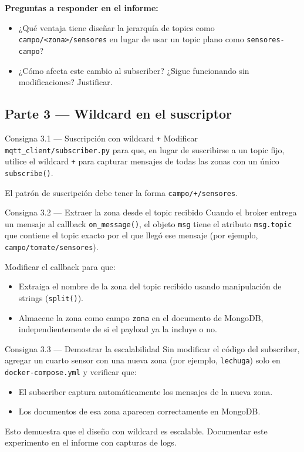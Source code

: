 \documentclass[12pt,a4paper]{article}
\begin{document}
\textbf{Preguntas a responder en el informe:}
\begin{itemize}
  \item ¿Qué ventaja tiene diseñar la jerarquía de topics como
        \texttt{campo/<zona>/sensores} en lugar de usar un topic
        plano como \texttt{sensores-campo}?
  \item ¿Cómo afecta este cambio al subscriber? ¿Sigue funcionando
        sin modificaciones? Justificar.
\end{itemize}

\subsection{Parte 3 — Wildcard en el suscriptor}

\begin{consigna}{Consigna 3.1 — Suscripción con wildcard \texttt{+}}
Modificar \texttt{mqtt\_client/subscriber.py} para que, en lugar de
suscribirse a un topic fijo, utilice el wildcard \texttt{+} para
capturar mensajes de todas las zonas con un único \texttt{subscribe()}.

El patrón de suscripción debe tener la forma \texttt{campo/+/sensores}.
\end{consigna}

\begin{consigna}{Consigna 3.2 — Extraer la zona desde el topic recibido}
Cuando el broker entrega un mensaje al callback \texttt{on\_message()},
el objeto \texttt{msg} tiene el atributo \texttt{msg.topic} que contiene
el topic exacto por el que llegó ese mensaje (por ejemplo,
\texttt{campo/tomate/sensores}).

Modificar el callback para que:
\begin{itemize}
  \item Extraiga el nombre de la zona del topic recibido usando manipulación
        de strings (\texttt{split()}).
  \item Almacene la zona como campo \texttt{zona} en el documento de MongoDB,
        independientemente de si el payload ya la incluye o no.
\end{itemize}
\end{consigna}

\begin{consigna}{Consigna 3.3 — Demostrar la escalabilidad}
Sin modificar el código del subscriber, agregar un cuarto sensor con una
nueva zona (por ejemplo, \texttt{lechuga}) solo en \texttt{docker-compose.yml}
y verificar que:
\begin{itemize}
  \item El subscriber captura automáticamente los mensajes de la nueva zona.
  \item Los documentos de esa zona aparecen correctamente en MongoDB.
\end{itemize}
Esto demuestra que el diseño con wildcard es escalable.
Documentar este experimento en el informe con capturas de logs.
\end{consigna}
\end{document}
